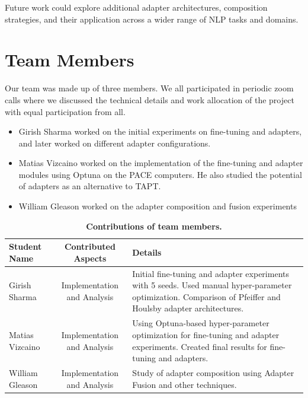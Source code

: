 \documentclass[10pt,twocolumn,letterpaper]{article}
\begin{document}
Future work could explore additional adapter architectures, composition strategies, and their application across a wider range of NLP tasks and domains.


\onecolumn

\section{Team Members}




Our team was made up of three members. We all participated in periodic zoom calls where we discussed the technical details and work allocation of the project with equal participation from all.

\begin{itemize}
    \item Girish Sharma worked on the initial experiments on fine-tuning and adapters, and later worked on different adapter configurations.
    \item Matias Vizcaino worked on the implementation of the fine-tuning and adapter modules using Optuna on the PACE computers. He also studied the potential of adapters as an alternative to TAPT.
    \item William Gleason worked on the adapter composition and fusion experiments
\end{itemize}

\begin{table}[h]
\begin{center}
\begin{tabular}{|l|c|p{8cm}|}
\hline
\textbf{Student Name} & \textbf{Contributed Aspects} & \textbf{Details} \\
\hline
Girish Sharma & Implementation and Analysis & Initial fine-tuning and adapter experiments with 5 seeds. Used manual hyper-parameter optimization. Comparison of Pfeiffer and Houlsby adapter architectures.  \\
Matias Vizcaino & Implementation and Analysis & Using Optuna-based hyper-parameter optimization for fine-tuning and adapter experiments. Created final results for fine-tuning and adapters. \\
William Gleason & Implementation and Analysis & Study of adapter composition using Adapter Fusion and other techniques. \\
\hline
\end{tabular}
\end{center}
\caption{\textbf{Contributions of team members.}}
\label{tab:contributions}
\end{table}
\FloatBarrier
\end{document}
